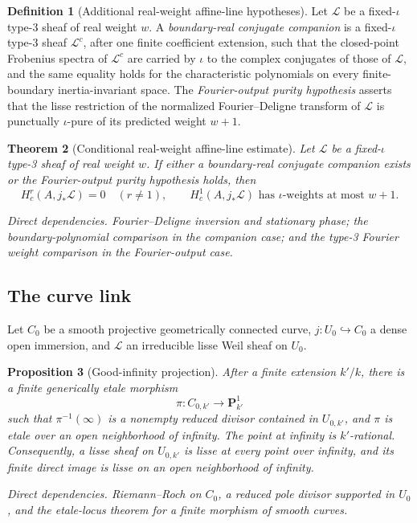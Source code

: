 \documentclass[10pt]{article}
\newtheorem{theorem}{Theorem}[section]
\newtheorem{proposition}[theorem]{Proposition}
\theoremstyle{definition}
\newtheorem{definition}[theorem]{Definition}
\newcommand{\dep}[1]{\par\smallskip\noindent\textit{Direct dependencies.} #1\par}
\begin{document}
\begin{definition}[Additional real-weight affine-line hypotheses]
Let \(\mathcal L\) be a fixed-\(\iota\) type-3 sheaf of real weight \(w\).
A \emph{boundary-real conjugate companion} is a fixed-\(\iota\) type-3 sheaf
\(\mathcal L^c\), after one finite coefficient extension, such that the
closed-point Frobenius spectra of \(\mathcal L^c\) are carried by \(\iota\)
to the complex conjugates of those of \(\mathcal L\), and the same equality
holds for the characteristic polynomials on every finite-boundary
inertia-invariant space.  The \emph{Fourier-output purity hypothesis}
asserts that the lisse restriction of the normalized Fourier--Deligne
transform of \(\mathcal L\) is punctually \(\iota\)-pure of its predicted
weight \(w+1\).
\end{definition}

\begin{theorem}[Conditional real-weight affine-line estimate]
Let \(\mathcal L\) be a fixed-\(\iota\) type-3 sheaf of real weight \(w\).
If either a
boundary-real conjugate companion exists or the Fourier-output purity
hypothesis holds, then
\[
 H_c^r(A,j_*\mathcal L)=0\quad(r\ne1),
 \qquad
 H_c^1(A,j_*\mathcal L)
       \text{ has \(\iota\)-weights at most }w+1.
\]
\dep{Fourier--Deligne inversion and stationary phase; the boundary-polynomial
comparison in the companion case; and the type-3 Fourier weight comparison
in the Fourier-output case.}
\end{theorem}

\subsection{The curve link}

Let \(C_0\) be a smooth projective geometrically connected curve,
\(j:U_0\hookrightarrow C_0\) a dense open immersion, and
\(\mathcal L\) an irreducible lisse Weil sheaf on \(U_0\).

\begin{proposition}[Good-infinity projection]
After a finite extension \(k'/k\), there is a finite generically etale
morphism
\[
                         \pi:C_{0,k'}\longrightarrow\mathbf P^1_{k'}
\]
such that \(\pi^{-1}(\infty)\) is a nonempty reduced divisor contained in
\(U_{0,k'}\), and \(\pi\) is etale over an open neighborhood of infinity.
The point at infinity is \(k'\)-rational.  Consequently, a lisse sheaf on
\(U_{0,k'}\) is lisse at every point over infinity, and its finite direct
image is lisse on an open neighborhood of infinity.
\dep{Riemann--Roch on \(C_0\), a reduced pole divisor supported in \(U_0\),
and the etale-locus theorem for a finite morphism of smooth curves.}
\end{proposition}
\end{document}
